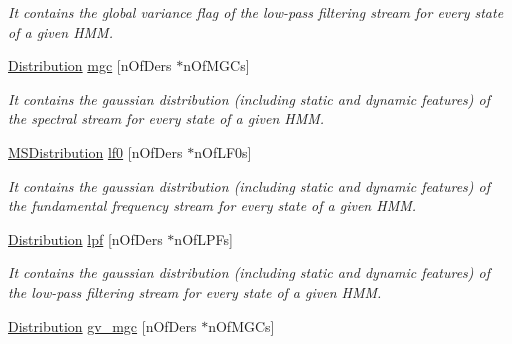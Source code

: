 \begin{DoxyCompactItemize}
\begin{DoxyCompactList}\small\item\em It contains the global variance flag of the low-\/pass filtering stream for every state of a given H\-M\-M. \end{DoxyCompactList}\item 
\hypertarget{struct_m_a_g_e_1_1_state_a1a8511f007e662b79fc204e4cb3261a4}{\hyperlink{struct_m_a_g_e_1_1_distribution}{Distribution} \hyperlink{struct_m_a_g_e_1_1_state_a1a8511f007e662b79fc204e4cb3261a4}{mgc} \mbox{[}n\-Of\-Ders $\ast$n\-Of\-M\-G\-Cs\mbox{]}}\label{struct_m_a_g_e_1_1_state_a1a8511f007e662b79fc204e4cb3261a4}

\begin{DoxyCompactList}\small\item\em It contains the gaussian distribution (including static and dynamic features) of the spectral stream for every state of a given H\-M\-M. \end{DoxyCompactList}\item 
\hypertarget{struct_m_a_g_e_1_1_state_a5e97786bd0abad3f676aab2e4238bd58}{\hyperlink{struct_m_a_g_e_1_1_m_s_distribution}{M\-S\-Distribution} \hyperlink{struct_m_a_g_e_1_1_state_a5e97786bd0abad3f676aab2e4238bd58}{lf0} \mbox{[}n\-Of\-Ders $\ast$n\-Of\-L\-F0s\mbox{]}}\label{struct_m_a_g_e_1_1_state_a5e97786bd0abad3f676aab2e4238bd58}

\begin{DoxyCompactList}\small\item\em It contains the gaussian distribution (including static and dynamic features) of the fundamental frequency stream for every state of a given H\-M\-M. \end{DoxyCompactList}\item 
\hypertarget{struct_m_a_g_e_1_1_state_a6d3ea7b615c59e014d82ebf67ae2766d}{\hyperlink{struct_m_a_g_e_1_1_distribution}{Distribution} \hyperlink{struct_m_a_g_e_1_1_state_a6d3ea7b615c59e014d82ebf67ae2766d}{lpf} \mbox{[}n\-Of\-Ders $\ast$n\-Of\-L\-P\-Fs\mbox{]}}\label{struct_m_a_g_e_1_1_state_a6d3ea7b615c59e014d82ebf67ae2766d}

\begin{DoxyCompactList}\small\item\em It contains the gaussian distribution (including static and dynamic features) of the low-\/pass filtering stream for every state of a given H\-M\-M. \end{DoxyCompactList}\item 
\hypertarget{struct_m_a_g_e_1_1_state_a69a8e57098ea4126782a671d42485f82}{\hyperlink{struct_m_a_g_e_1_1_distribution}{Distribution} \hyperlink{struct_m_a_g_e_1_1_state_a69a8e57098ea4126782a671d42485f82}{gv\-\_\-mgc} \mbox{[}n\-Of\-Ders $\ast$n\-Of\-M\-G\-Cs\mbox{]}}\label{struct_m_a_g_e_1_1_state_a69a8e57098ea4126782a671d42485f82}


\end{DoxyCompactItemize}
